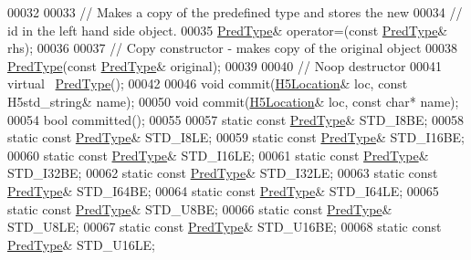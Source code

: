 \begin{DoxyCode}
00032 
00033         \textcolor{comment}{// Makes a copy of the predefined type and stores the new}
00034         \textcolor{comment}{// id in the left hand side object.}
00035         \hyperlink{class_h5_1_1_pred_type}{PredType}& operator=(\textcolor{keyword}{const} \hyperlink{class_h5_1_1_pred_type}{PredType}& rhs);
00036 
00037         \textcolor{comment}{// Copy constructor - makes copy of the original object}
00038         \hyperlink{class_h5_1_1_pred_type}{PredType}(\textcolor{keyword}{const} \hyperlink{class_h5_1_1_pred_type}{PredType}& original);
00039 
00040         \textcolor{comment}{// Noop destructor}
00041         \textcolor{keyword}{virtual} ~\hyperlink{class_h5_1_1_pred_type}{PredType}();
00042 
00046         \textcolor{keywordtype}{void} commit(\hyperlink{class_h5_1_1_h5_location}{H5Location}& loc, \textcolor{keyword}{const} H5std\_string& name);
00050         \textcolor{keywordtype}{void} commit(\hyperlink{class_h5_1_1_h5_location}{H5Location}& loc, \textcolor{keyword}{const} \textcolor{keywordtype}{char}* name);
00054         \textcolor{keywordtype}{bool} committed();
00055 
00057         \textcolor{keyword}{static} \textcolor{keyword}{const} \hyperlink{class_h5_1_1_pred_type}{PredType}& STD\_I8BE;
00058         \textcolor{keyword}{static} \textcolor{keyword}{const} \hyperlink{class_h5_1_1_pred_type}{PredType}& STD\_I8LE;
00059         \textcolor{keyword}{static} \textcolor{keyword}{const} \hyperlink{class_h5_1_1_pred_type}{PredType}& STD\_I16BE;
00060         \textcolor{keyword}{static} \textcolor{keyword}{const} \hyperlink{class_h5_1_1_pred_type}{PredType}& STD\_I16LE;
00061         \textcolor{keyword}{static} \textcolor{keyword}{const} \hyperlink{class_h5_1_1_pred_type}{PredType}& STD\_I32BE;
00062         \textcolor{keyword}{static} \textcolor{keyword}{const} \hyperlink{class_h5_1_1_pred_type}{PredType}& STD\_I32LE;
00063         \textcolor{keyword}{static} \textcolor{keyword}{const} \hyperlink{class_h5_1_1_pred_type}{PredType}& STD\_I64BE;
00064         \textcolor{keyword}{static} \textcolor{keyword}{const} \hyperlink{class_h5_1_1_pred_type}{PredType}& STD\_I64LE;
00065         \textcolor{keyword}{static} \textcolor{keyword}{const} \hyperlink{class_h5_1_1_pred_type}{PredType}& STD\_U8BE;
00066         \textcolor{keyword}{static} \textcolor{keyword}{const} \hyperlink{class_h5_1_1_pred_type}{PredType}& STD\_U8LE;
00067         \textcolor{keyword}{static} \textcolor{keyword}{const} \hyperlink{class_h5_1_1_pred_type}{PredType}& STD\_U16BE;
00068         \textcolor{keyword}{static} \textcolor{keyword}{const} \hyperlink{class_h5_1_1_pred_type}{PredType}& STD\_U16LE;

\end{DoxyCode}
